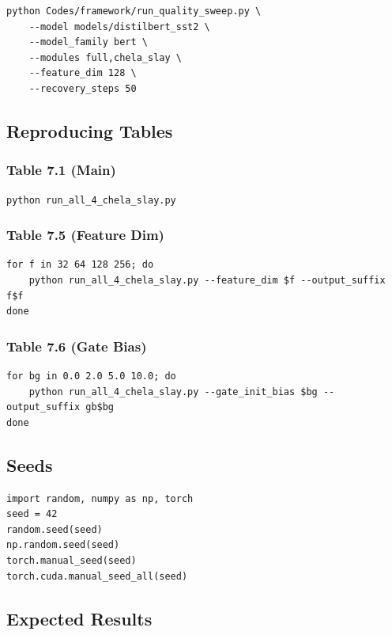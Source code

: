 \begin{lstlisting}
python Codes/framework/run_quality_sweep.py \
    --model models/distilbert_sst2 \
    --model_family bert \
    --modules full,chela_slay \
    --feature_dim 128 \
    --recovery_steps 50
\end{lstlisting}

\subsection{Reproducing Tables}

\subsubsection{Table 7.1 (Main)}
\begin{lstlisting}
python run_all_4_chela_slay.py
\end{lstlisting}

\subsubsection{Table 7.5 (Feature Dim)}
\begin{lstlisting}
for f in 32 64 128 256; do
    python run_all_4_chela_slay.py --feature_dim $f --output_suffix f$f
done
\end{lstlisting}

\subsubsection{Table 7.6 (Gate Bias)}
\begin{lstlisting}
for bg in 0.0 2.0 5.0 10.0; do
    python run_all_4_chela_slay.py --gate_init_bias $bg --output_suffix gb$bg
done
\end{lstlisting}

\subsection{Seeds}

\begin{lstlisting}
import random, numpy as np, torch
seed = 42
random.seed(seed)
np.random.seed(seed)
torch.manual_seed(seed)
torch.cuda.manual_seed_all(seed)
\end{lstlisting}

\subsection{Expected Results}

